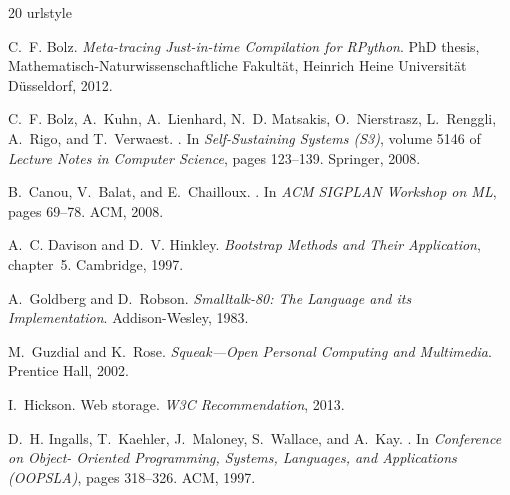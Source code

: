 \documentclass[natbib]{sigplanconf}
\begin{document}

{
\begin{thebibliography}{20}
\providecommand{\natexlab}[1]{#1}
\providecommand{\url}[1]{\texttt{#1}}
\expandafter\ifx\csname urlstyle\endcsname\relax
  \providecommand{\doi}[1]{doi: #1}\else
  \providecommand{\doi}{doi: \begingroup \urlstyle{rm}\Url}\fi

C.~F. Bolz.
\newblock \emph{{Meta-tracing Just-in-time Compilation for RPython}}.
\newblock PhD thesis, Mathematisch-Naturwissenschaftliche Fakult\"at, Heinrich
  Heine Universit\"at D\"usseldorf, 2012.

C.~F. Bolz, A.~Kuhn, A.~Lienhard, N.~D. Matsakis, O.~Nierstrasz, L.~Renggli,
  A.~Rigo, and T.~Verwaest.
.
\newblock In \emph{Self-Sustaining Systems (S3)}, volume 5146 of \emph{Lecture
  Notes in Computer Science}, pages 123--139. Springer, 2008.

B.~Canou, V.~Balat, and E.~Chailloux.
.
\newblock In \emph{ACM SIGPLAN Workshop on ML}, pages 69--78. ACM, 2008.

A.~C. Davison and D.~V. Hinkley.
\newblock \emph{Bootstrap Methods and Their Application}, chapter~5.
\newblock Cambridge, 1997.

A.~Goldberg and D.~Robson.
\newblock \emph{{Smalltalk-80: The Language and its Implementation}}.
\newblock Addison-Wesley, 1983.

M.~Guzdial and K.~Rose.
\newblock \emph{{Squeak---Open Personal Computing and Multimedia}}.
\newblock Prentice Hall, 2002.

I.~Hickson.
\newblock Web storage.
\newblock \emph{W3C Recommendation}, 2013.

D.~H. Ingalls, T.~Kaehler, J.~Maloney, S.~Wallace, and A.~Kay.
.
\newblock In \emph{Conference on Object- Oriented Programming, Systems,
  Languages, and Applications (OOPSLA)}, pages 318--326. ACM, 1997.


\end{thebibliography}}
\end{document}
